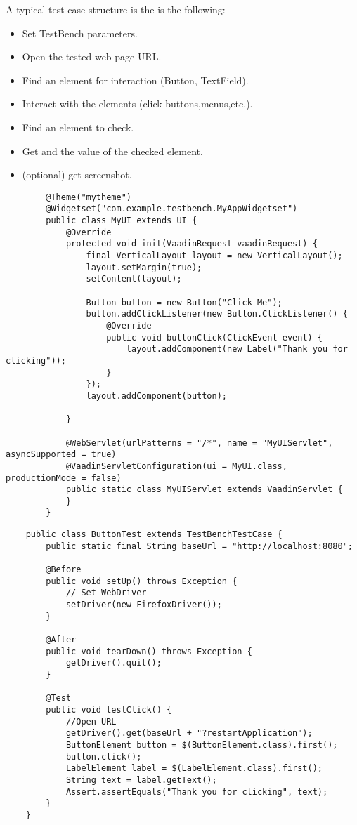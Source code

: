A typical test case structure is the is the following:
\begin{itemize}
  \item Set TestBench parameters.
  \item Open the tested web-page URL.
  \item Find an element for interaction (Button, TextField).
  \item Interact with the elements (click buttons,menus,etc.).
  \item Find an element to check.
  \item Get and the value of the checked element.
  \item (optional) get screenshot.
\end{itemize}
	\lstset{language=Java}
	\begin{lstlisting}
		@Theme("mytheme")
		@Widgetset("com.example.testbench.MyAppWidgetset")
		public class MyUI extends UI {
		    @Override
		    protected void init(VaadinRequest vaadinRequest) {
		        final VerticalLayout layout = new VerticalLayout();
		        layout.setMargin(true);
		        setContent(layout);
		
		        Button button = new Button("Click Me");
		        button.addClickListener(new Button.ClickListener() {
		            @Override
		            public void buttonClick(ClickEvent event) {
		                layout.addComponent(new Label("Thank you for clicking"));
		            }
		        });
		        layout.addComponent(button);
		
		    }
		
		    @WebServlet(urlPatterns = "/*", name = "MyUIServlet", asyncSupported = true)
		    @VaadinServletConfiguration(ui = MyUI.class, productionMode = false)
		    public static class MyUIServlet extends VaadinServlet {
		    }
		}
	\end{lstlisting}
	\lstset{language=Java}
	\begin{lstlisting}
	public class ButtonTest extends TestBenchTestCase {
	    public static final String baseUrl = "http://localhost:8080";
	
	    @Before
	    public void setUp() throws Exception {
	        // Set WebDriver
	        setDriver(new FirefoxDriver());
	    }
	
	    @After
	    public void tearDown() throws Exception {
	        getDriver().quit();
	    }
	
	    @Test
	    public void testClick() {
	    	//Open URL
	        getDriver().get(baseUrl + "?restartApplication");
	        ButtonElement button = $(ButtonElement.class).first();
	        button.click();
	        LabelElement label = $(LabelElement.class).first();
	        String text = label.getText();
	        Assert.assertEquals("Thank you for clicking", text);
	    }
	}
	\end{lstlisting}
	

